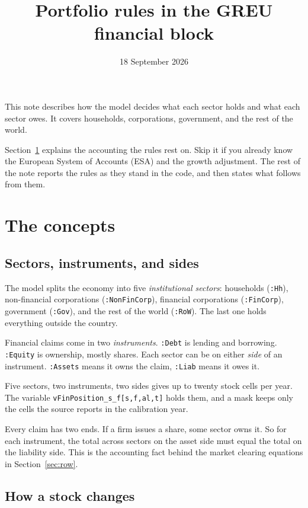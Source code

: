 \documentclass[11pt,a4paper]{article}
\title{Portfolio rules in the GREU financial block}
\author{}
\date{18 September 2026}
\begin{document}
\maketitle

This note describes how the model decides what each sector holds and what each
sector owes. It covers households, corporations, government, and the rest of the
world.

Section~\ref{sec:concepts} explains the accounting the rules rest on. Skip it if
you already know the European System of Accounts (ESA) and the growth adjustment.
The rest of the note reports the rules as they stand in the code, and then states
what follows from them.

\section{The concepts}
\label{sec:concepts}

\subsection{Sectors, instruments, and sides}
\label{sec:sectors}

The model splits the economy into five \emph{institutional sectors}: households
(\texttt{:Hh}), non-financial corporations (\texttt{:NonFinCorp}), financial
corporations (\texttt{:FinCorp}), government (\texttt{:Gov}), and the rest of the
world (\texttt{:RoW}). The last one holds everything outside the country.

Financial claims come in two \emph{instruments}. \texttt{:Debt} is lending and
borrowing. \texttt{:Equity} is ownership, mostly shares. Each sector can be on
either \emph{side} of an instrument. \texttt{:Assets} means it owns the claim,
\texttt{:Liab} means it owes it.

Five sectors, two instruments, two sides gives up to twenty stock cells per year.
The variable \texttt{vFinPosition\_s\_f[s,f,al,t]} holds them, and a mask keeps
only the cells the source reports in the calibration year.

Every claim has two ends. If a firm issues a share, some sector owns it. So for
each instrument, the total across sectors on the asset side must equal the total on
the liability side. This is the accounting fact behind the market clearing
equations in Section~\ref{sec:row}.

\subsection{How a stock changes}
\label{sec:stockchange}
\end{document}
